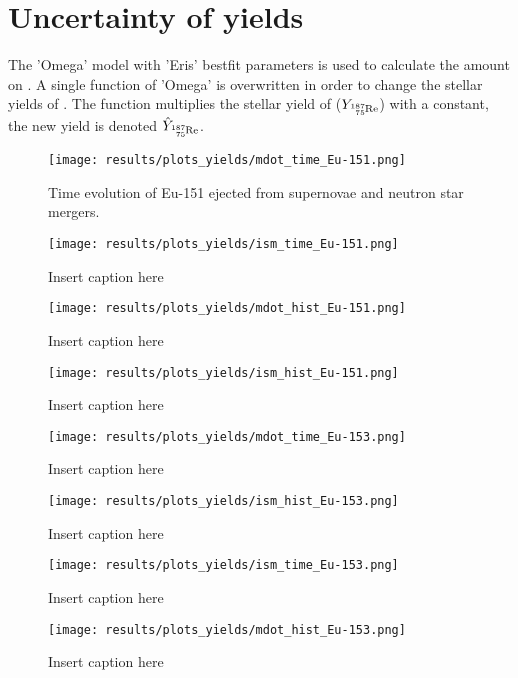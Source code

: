 \section{Uncertainty of yields}
The 'Omega' model with 'Eris' bestfit parameters is used to calculate the amount on .
A single function of 'Omega' is overwritten in order to change the stellar yields of .
The function multiplies the stellar yield of  ($Y_\re{187}$) with a constant, the new yield is denoted $\hat{Y}_\re{187}$.

\begin{figure}
  \centering
  \texttt{[image: results/plots\_yields/mdot\_time\_Eu-151.png]}
  \caption{Time evolution of Eu-151 ejected from supernovae and neutron star mergers.}
\end{figure}
\begin{figure}
  \centering
  \texttt{[image: results/plots\_yields/ism\_time\_Eu-151.png]}
  \caption{Insert caption here}
\end{figure}
\begin{figure}
  \centering
  \texttt{[image: results/plots\_yields/mdot\_hist\_Eu-151.png]}
  \caption{Insert caption here}
\end{figure}
\begin{figure}
  \centering
  \texttt{[image: results/plots\_yields/ism\_hist\_Eu-151.png]}
  \caption{Insert caption here}
\end{figure}

\begin{figure}
  \centering
  \texttt{[image: results/plots\_yields/mdot\_time\_Eu-153.png]}
  \caption{Insert caption here}
\end{figure}
\begin{figure}
  \centering
  \texttt{[image: results/plots\_yields/ism\_hist\_Eu-153.png]}
  \caption{Insert caption here}
\end{figure}
\begin{figure}
  \centering
  \texttt{[image: results/plots\_yields/ism\_time\_Eu-153.png]}
  \caption{Insert caption here}
\end{figure}
\begin{figure}
  \centering
  \texttt{[image: results/plots\_yields/mdot\_hist\_Eu-153.png]}
  \caption{Insert caption here}
\end{figure}


